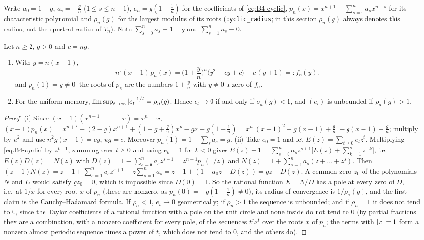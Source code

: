Write $a_0=1-g$, $a_s=-\frac gn$ ($1\le s\le n-1$), $a_n=g(1-\frac1n)$ for the coefficients of \eqref{eq:B4-cyclic}, $p_n(x)=x^{n+1}-\sum_{s=0}^na_sx^{n-s}$ for its characteristic polynomial and $\rho_n(g)$ for the largest modulus of its roots (\texttt{cyclic\_radius}; in this section $\rho_n(g)$ always denotes this radius, not the spectral radius of $T_n$). Note $\sum_{s=0}^na_s=1-g$ and $\sum_{s=1}^na_s=0$.

\begin{lemma}\label{lem:B4-char}
Let $n\ge2$, $g>0$ and $c=ng$.
\begin{enumerate}[label=(\roman*)]
\item With $y=n(x-1)$,
\begin{equation}\label{eq:B4-char-n}
n^2(x-1)\,p_n(x)=\Big(1+\frac yn\Big)^n\big(y^2+cy+c\big)-c\,(y+1)=:f_n(y),
\end{equation}
and $p_n(1)=g\ne0$: the roots of $p_n$ are the numbers $1+\frac yn$ with $y\ne0$ a zero of $f_n$.
\item For the uniform memory, $\limsup_{t\to\infty}\left|e_t\right|^{1/t}=\rho_n(g)$. Hence $e_t\to0$ if and only if $\rho_n(g)<1$, and $(e_t)$ is unbounded if $\rho_n(g)>1$.
\end{enumerate}
\end{lemma}
\begin{proof}
(i) Since $(x-1)(x^{n-1}+\dots+x)=x^n-x$,
$(x-1)p_n(x)=x^{n+2}-(2-g)x^{n+1}+(1-g+\frac gn)x^n-gx+g(1-\frac1n)
=x^n\big[(x-1)^2+g(x-1)+\frac gn\big]-g(x-1)-\frac gn$; multiply by $n^2$ and use $n^2g(x-1)=cy$, $ng=c$. Moreover $p_n(1)=1-\sum_sa_s=g$.
(ii) Take $e_0=1$ and let $E(z)=\sum_{t\ge0}e_tz^t$. Multiplying \eqref{eq:B4-cyclic} by $z^{t+1}$, summing over $t\ge0$ and using $e_k=1$ for $k<0$ gives $E(z)-1=\sum_{s=0}^na_sz^{s+1}\big[E(z)+\sum_{k=1}^sz^{-k}\big]$, i.e.\ $E(z)D(z)=N(z)$ with $D(z)=1-\sum_{s=0}^na_sz^{s+1}=z^{n+1}p_n(1/z)$ and $N(z)=1+\sum_{s=1}^na_s(z+\dots+z^s)$. Then $(z-1)N(z)=z-1+\sum_{s=1}^na_sz^{s+1}-z\sum_{s=1}^na_s=z-1+(1-a_0z-D(z))=gz-D(z)$. A common zero $z_0$ of the polynomials $N$ and $D$ would satisfy $gz_0=0$, which is impossible since $D(0)=1$. So the rational function $E=N/D$ has a pole at every zero of $D$, i.e.\ at $1/x$ for every root $x$ of $p_n$ (these are nonzero, as $p_n(0)=-g(1-\frac1n)\ne0$), its radius of convergence is $1/\rho_n(g)$, and the first claim is the Cauchy--Hadamard formula. If $\rho_n<1$, $e_t\to0$ geometrically; if $\rho_n>1$ the sequence is unbounded; and if $\rho_n=1$ it does not tend to $0$, since the Taylor coefficients of a rational function with a pole on the unit circle and none inside do not tend to $0$ (by partial fractions they are a combination, with a nonzero coefficient for every pole, of the sequences $t^jx^t$ over the roots $x$ of $p_n$; the terms with $\left|x\right|=1$ form a nonzero almost periodic sequence times a power of $t$, which does not tend to $0$, and the others do).
\end{proof}

